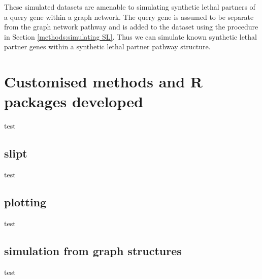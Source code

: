 These simulated datasets are amenable to simulating synthetic lethal partners of a query gene within a graph network. The query gene is assumed to be separate from the graph network pathway and is added to the dataset using the procedure in Section \ref{methods:simulating SL}. Thus we can simulate known synthetic lethal partner genes within a synthetic lethal partner pathway structure.

\section{Customised methods and R packages developed}
test

\subsection{slipt}
test

\subsection{plotting}
test

\subsection{simulation from graph structures}
test

